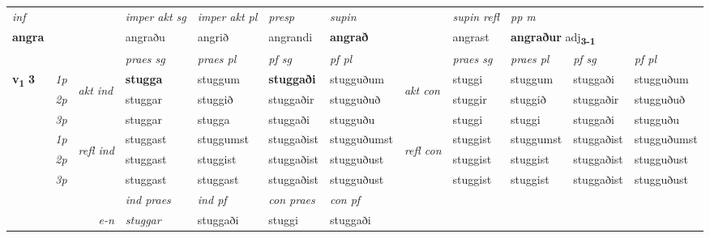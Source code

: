 \begin{longtable}[l]{X>{\footnotesize\itshape}llXXXXlXXXX}
   {\textit{inf}} & &  & \textit{imper akt sg} & \textit{imper akt pl}   & \textit{presp} & \textit{supin} && \textit{supin refl} & \textit{pp m} \\*
  {\textbf{angra}} & && angraðu  & angrið   & angrandi &  \textbf{angrað} && angrast & \multicolumn{2}{l}{\textbf{angraður} adj\textbf{\textsubscript{3-1}}} \\*

\midrule

 & &   & \textit{praes sg}  & \textit{praes pl}    & \textit{ pf sg} & \textit{pf pl} & & \textit{praes sg}  & \textit{praes pl}    & \textit{pf sg} & \textit{pf pl }  \\ \cmidrule{4-7} \cmidrule{9-12}
 \multirow{2}{*}{{{\textbf{v{\textsubscript{1}}} \Large{\textbf{3}}}}}  & 1p & \multirow{3}{*}{\begin{turn}{90}\textit{akt ind}\end{turn}} & \textbf{stugga} & stuggum & \textbf{stuggaði} & stugguðum & \multirow{3}{*}{\begin{turn}{90}\textit{akt con}\end{turn}} &stuggi & stuggum & stuggaði & stugguðum\\*
 & 2p &  &  stuggar  & stuggið & stuggaðir & stugguðuð & & stuggir & stuggið & stuggaðir & stugguðuð \\*
 & 3p &  & stuggar & stugga & stuggaði & stugguðu & & stuggi & stuggi& stuggaði & stugguðu \\*
\cmidrule{4-7} \cmidrule{9-12}
 & 1p & \multirow{3}{*}{\begin{turn}{90}\textit{refl ind}\end{turn}}  & stuggast & stuggumst & stuggaðist & stugguðumst & \multirow{3}{*}{\begin{turn}{90}\textit{refl con}\end{turn}}  &stuggist & stuggumst & stuggaðist & stugguðumst \\*
 & 2p &  & stuggast & stuggist & stuggaðist & stugguðust & &stuggist & stuggist & stuggaðist & stugguðust \\*
 & 3p  & & stuggast & stuggast & stuggaðist & stugguðust & & stuggist & stuggist& stuggaðist & stugguðust \\*
\cmidrule{4-7} \cmidrule{9-12}

   && &  \textit{ind praes} & \textit{ind pf} & \textit{con praes} & \textit{con pf} \\*
\multicolumn{3}{r}{\textit{e-n}} & stuggar & stuggaði & stuggi & stuggaði \\*


\end{longtable}
